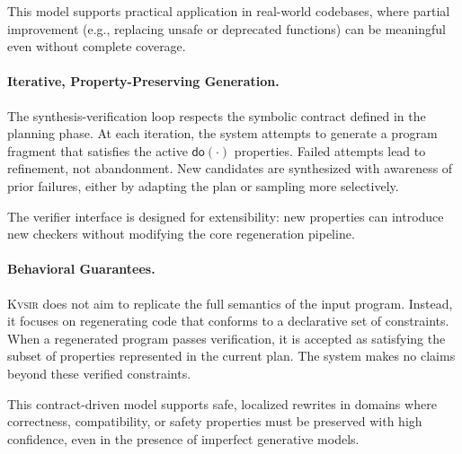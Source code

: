 \documentclass[sigplan]{acmart}
\newcommand{\sys}{{\scshape Kv{\textalpha}sir}\xspace}
\begin{document}
This model supports practical application in real-world codebases, where partial improvement (e.g., replacing unsafe or deprecated functions) can be meaningful even without complete coverage.

\paragraph{Iterative, Property-Preserving Generation.}
The synthesis-verification loop respects the symbolic contract defined in the planning phase. At each iteration, the system attempts to generate a program fragment that satisfies the active $\mathsf{do}(\cdot)$ properties. Failed attempts lead to refinement, not abandonment. New candidates are synthesized with awareness of prior failures, either by adapting the plan or sampling more selectively.

The verifier interface is designed for extensibility: new properties can introduce new checkers without modifying the core regeneration pipeline.

\paragraph{Behavioral Guarantees.}
\sys does not aim to replicate the full semantics of the input program. Instead, it focuses on regenerating code that conforms to a declarative set of constraints. When a regenerated program passes verification, it is accepted as satisfying the subset of properties represented in the current plan. The system makes no claims beyond these verified constraints.

This contract-driven model supports safe, localized rewrites in domains where correctness, compatibility, or safety properties must be preserved with high confidence, even in the presence of imperfect generative models.


\end{document}
